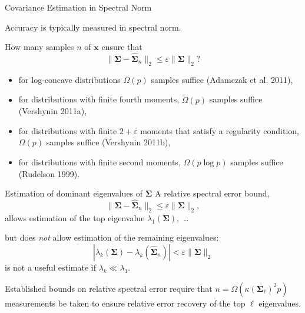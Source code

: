 \documentclass[xcolor={svgnames,pdftex,dvipsnames,table},10pt]{beamer} %
\newcommand{\mat}[1]{\ensuremath{\mathbf{#1}}}
\begin{document}
\begin{frame}{Covariance Estimation in Spectral Norm}

Accuracy is typically measured in spectral norm.
\vspace{1em}
\begin{displaybox}{0.7\linewidth}
\parbox{\linewidth}{%
How many samples $n$ of $\mat{x}$ ensure that
\[ \|\mat{\Sigma} - \widehat{\mat{\Sigma}}_n\|_2 \leq \varepsilon \|\mat{\Sigma}\|_2? \]
}
\end{displaybox}

\begin{itemize}
    \item for \textcolor{OliveGreen}{log-concave} distributions $\Omega(p)$ samples suffice (Adamczak et al. 2011), 
    \item for distributions with \textcolor{OliveGreen}{finite fourth moments}, $\tilde{\Omega}(p)$ samples suffice (Vershynin 2011a), 
		\item for distributions with \textcolor{OliveGreen}{finite $2+\varepsilon$ moments} that satisfy a regularity condition, $\Omega(p)$ samples suffice (Vershynin 2011b),
    \item for distributions with \textcolor{OliveGreen}{finite second moments}, $\Omega(p\log p)$ samples suffice (Rudelson 1999). 
\end{itemize}
\end{frame}

\begin{frame}{Estimation of dominant eigenvalues of $\mat{\Sigma}$}
A relative spectral error bound,
\[
\|\mat{\Sigma} - \widehat{\mat{\Sigma}}_n\|_2 \leq \varepsilon \|\mat{\Sigma}\|_2,
\]
allows estimation of the top eigenvalue $\lambda_1(\mat{\Sigma}),$ \ldots

\vspace{1em}
but does \emph{not} allow estimation of the remaining eigenvalues:
\[
|\lambda_k(\mat{\Sigma}) - \lambda_k(\widehat{\mat{\Sigma}}_n)| < \varepsilon \|\mat{\Sigma}\|_2 
\]
is not a useful estimate if $\lambda_k \ll \lambda_1.$

\vspace{1em}
Established bounds on relative spectral error require that $n = \Omega(\kappa(\mat{\Sigma}_\ell)^2 p)$ measurements be taken to ensure relative error recovery of the top $\ell$ eigenvalues.
\end{frame}
\end{document}
